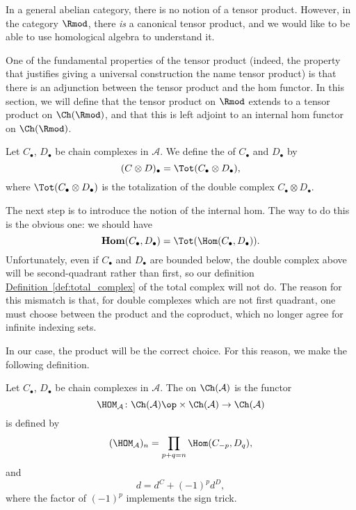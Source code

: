 \documentclass[main.tex]{subfiles}
\begin{document}
In a general abelian category, there is no notion of a tensor product. However, in the category $\Rmod$, there \emph{is} a canonical tensor product, and we would like to be able to use homological algebra to understand it.

One of the fundamental properties of the tensor product (indeed, the property that justifies giving a universal construction the name tensor product) is that there is an adjunction between the tensor product and the hom functor. In this section, we will define that the tensor product on $\Rmod$ extends to a tensor product on $\Ch(\Rmod)$, and that this is left adjoint to an internal hom functor on $\Ch(\Rmod)$.

\begin{definition}
  \label{def:tensor_product_of_chain_complexes}
  Let $C_{\bullet}$, $D_{\bullet}$ be chain complexes in $\mathcal{A}$. We define the  of $C_{\bullet}$ and $D_{\bullet}$ by
  \begin{equation*}
    (C \otimes D)_{\bullet} = \Tot(C_{\bullet} \otimes D_{\bullet}),
  \end{equation*}
  where $\Tot(C_{\bullet} \otimes D_{\bullet})$ is the totalization of the double complex $C_{\bullet} \otimes D_{\bullet}$.
\end{definition}

The next step is to introduce the notion of the internal hom. The way to do this is the obvious one: we should have
\begin{equation*}
  \mathbf{Hom}(C_{\bullet}, D_{\bullet}) = \Tot(\Hom(C_{\bullet}, D_{\bullet})).
\end{equation*}
Unfortunately, even if $C_{\bullet}$ and $D_{\bullet}$ are bounded below, the double complex above will be second-quadrant rather than first, so our definition \hyperref[def:total_complex]{Definition~\ref*{def:total_complex}} of the total complex will not do. The reason for this mismatch is that, for double complexes which are not first quadrant, one must choose between the product and the coproduct, which no longer agree for infinite indexing sets.

In our case, the product will be the correct choice. For this reason, we make the following definition.

\begin{definition}
  \label{def:internal_hom}
  Let $C_{\bullet}$, $D_{\bullet}$ be chain complexes in $\mathcal{A}$. The  on $\Ch(\mathcal{A})$ is the functor
  \begin{equation*}
    \HOM_{\mathcal{A}}\colon \Ch(\mathcal{A})\op \times \Ch(\mathcal{A}) \to \Ch(\mathcal{A})
  \end{equation*}
  is defined by
  \begin{equation*}
    (\HOM_{\mathcal{A}})_{n} = \prod_{p+q=n} \Hom(C_{-p}, D_{q}),
  \end{equation*}
  and
  \begin{equation*}
    d = d^{C} + (-1)^{p} d^{D},
  \end{equation*}
  where the factor of $(-1)^{p}$ implements the sign trick.
\end{definition}
\end{document}
